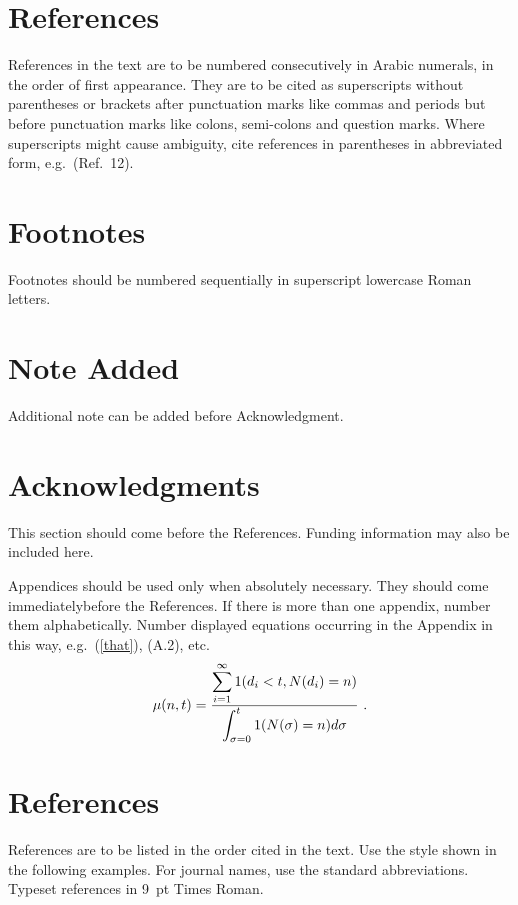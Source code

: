 \documentclass[11pt,twoside]{article}
\begin{document}
\begin{multicols}{2}
\section{References}

References in the text are to be numbered consecutively in Arabic
numerals, in the order of first appearance. They are to be cited as
superscripts without parentheses or brackets after punctuation marks
like commas and periods but before punctuation marks like colons,
semi-colons and question marks. Where superscripts might cause
ambiguity, cite references in parentheses in abbreviated form,
e.g.~(Ref.~12).

\section{Footnotes}

Footnotes should be numbered sequentially in superscript
lowercase Roman letters.

\section*{Note Added}

Additional note can be added before Acknowledgment.

\section*{Acknowledgments}

This section should come before the References. Funding
information may also be included here.

\appendix{}

Appendices should be used only when absolutely necessary. They should
come immediately\break before the References. If there is more than
one appendix, number them alphabetically. Number%
displayed equations occurring in the Appendix in this way, e.g.~(\ref{that}),
(A.2), etc.
\begin{equation}
\mu(n,t) = {\displaystyle\sum^\infty_{i=1} 1(d_i < t, N(d_i) = n) \over
\displaystyle\int^t_{\sigma=0} 1(N(\sigma) = n)d\sigma}\,\, .\label{that}
\end{equation}

\section*{References}
References are to be listed in the order cited in the text. Use the style shown
in the following examples. For journal names, use the standard abbreviations.
Typeset references in 9~pt Times Roman.


\end{multicols}
\end{document}
